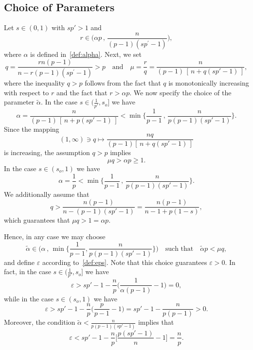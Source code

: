 \documentclass[10pt,letterpaper]{amsart}
\theoremstyle{definition}
\numberwithin{theorem}{section}
\numberwithin{equation}{section}
\newcommand{\1}{\ensuremath{\mathds{1}}}
\renewcommand{\epsilon}{\varepsilon}
\renewcommand{\epsilon}{\varepsilon}
\numberwithin{equation}{section}
\begin{document}
\subsection{Choice of Parameters}\label{sec:parameters}
Let $s\in(0,1)$ with $sp'>1$ and 
\begin{equation*}
    r
    \in
    \bigg(\alpha p\,,\, \frac{n}{(p-1)(sp^{\prime}-1)}\bigg),
\end{equation*}
where $\alpha$ is defined in~\eqref{def:alpha}. Next, we set
$$
    q=\frac{rn(p-1)}{n-r(p-1)(sp^{\prime}-1)}
    > p
    \quad\mbox{and}\quad 
    \mu=\frac{r}{q}
    =
    \frac{n}{(p-1)\,[\,n+q(sp'-1)\,]},
$$
where the inequality $q>p$ follows from the fact that $q$ is monotonically increasing with respect to $r$ and the fact that $r>\alpha p$. 
We now specify the choice of the parameter $\tilde\alpha$.
In the case $s\in(\frac{1}{p'},s_o]$ we have
\[
    \alpha
    =
    \frac{n}{(p-1)\,[\,n+p(sp'-1)\,]}
    <
    \min\bigg\{\frac{1}{p-1}\,,\, \frac{n}{p(p-1)(sp'-1)} \bigg\}.
\]
Since the mapping
\[
(1,\infty)\ni q \longmapsto \frac{nq}{(p-1)[\,n+q(sp'-1)\,]}
\]
is increasing, the assumption $q>p$ implies
\[
\mu q>\alpha p\ge 1.
\]
In the case $s\in(s_o,1)$ we have 
$$
    \alpha
    =
    \frac{1}{p}
    <
    \min\bigg\{\frac{1}{p-1}\,,\, \frac{n}{p(p-1)(sp'-1)} \bigg\}.
$$
We additionally assume that
\[
    q
    > 
    \frac{n(p-1)}{n-(p-1)(sp'-1)}
    =
    \frac{n(p-1)}{n-1+p(1-s)},
\]
which guarantees that $\mu q > 1=\alpha p$.

Hence, in any case we may choose
\begin{equation}\label{restrict:tilde-alpha}
        \tilde\alpha
    \in
    \bigg(
        \alpha\,,\,
        \min\bigg\{\frac{1}{p-1},\frac{n}{p(p-1)(sp'-1)}\bigg\}
    \bigg)
\quad\text{such that}\quad
\tilde\alpha p< \mu q,
\end{equation}
and define $\epsilon$ according to~\eqref{def:eps}.
Note that this choice guarantees $\epsilon>0$. In fact, in the case $s\in(\frac{1}{p'},s_o]$
we have 
$$
    \epsilon
    >
    sp' - 1 - \frac{n}{p}\Big(\frac{1}{\alpha(p-1)}-1\Big)
    =
    0,
$$
while in the case $s\in(s_o,1)$
we have 
$$
    \epsilon
    >
    sp' - 1 - \frac{n}{p}\Big(\frac{p}{p-1}-1\Big)
    =
    sp' - 1 - \frac{n}{p(p-1)}
    >
    0.
$$
Moreover, the condition $\tilde\alpha<\frac{n}{p(p-1)(sp'-1)}$ implies that
\[
    \epsilon 
    <
    sp' - 1 - \frac{n}{p}\bigg[\frac{p(sp'-1)}{n}-1\bigg]
    =
    \frac{n}{p}.
\]
\end{document}
